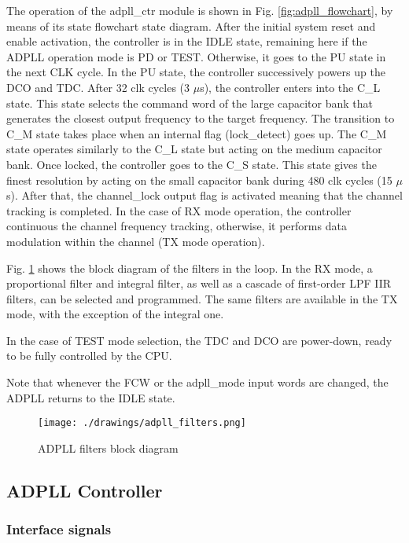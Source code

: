 The operation of the adpll\_ctr module is shown in
Fig. \ref{fig:adpll_flowchart}, by means of its state flowchart state diagram.
After the initial system reset and enable activation, the controller is in the
IDLE state, remaining here if the ADPLL operation mode is PD or TEST. Otherwise,
it goes to the PU state in the next CLK cycle. In the PU state, the controller
successively powers up the DCO and TDC. After 32 clk cycles (3 $\mu$s), the
controller enters into the C\_L state. This state selects the command word of
the large capacitor bank that generates the closest output frequency to the
target frequency. The transition to C\_M state takes place when an internal
flag (lock\_detect) goes up. The C\_M state operates similarly to the C\_L
state but acting on the medium capacitor bank. Once locked, the controller
goes to the C\_S state. This state gives the finest resolution by acting on the
small capacitor bank during 480 clk cycles (15 $\mu$s). After that, the
channel\_lock output flag is activated meaning that the channel tracking is
completed. In the case of RX mode operation, the controller continuous the
channel frequency tracking, otherwise, it performs data modulation within the
channel (TX mode operation).

Fig. \ref{fig:adpll_filters} shows the block diagram of the filters in the loop.
In the RX mode, a proportional filter and integral filter, as well as
a cascade of first-order LPF IIR filters, can be selected and programmed. The
same filters are available in the TX mode, with the exception of the integral
one.

In the case of TEST mode selection, the TDC and DCO are power-down, ready to be
fully controlled by the CPU. 

Note that whenever the FCW or the adpll\_mode input words are changed, the ADPLL
returns to the IDLE state.




\begin{figure}[!h]
  \centering
      {\texttt{[image: ./drawings/adpll\_filters.png]}}
  \caption{ADPLL filters block diagram}
  \label{fig:adpll_filters}
\end{figure}

\subsection{ADPLL Controller}

\subsubsection{Interface signals}


